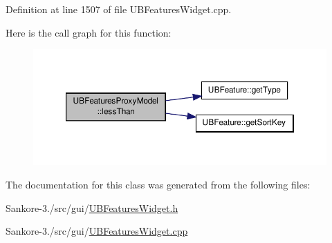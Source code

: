 Definition at line 1507 of file U\-B\-Features\-Widget.\-cpp.



Here is the call graph for this function\-:
\nopagebreak
\begin{figure}[H]
\begin{center}
\leavevmode
\includegraphics[width=350pt]{d9/d6c/class_u_b_features_proxy_model_a7c0c13cd786423d0522355b9ef50b9a0_cgraph}
\end{center}
\end{figure}




The documentation for this class was generated from the following files\-:\begin{DoxyCompactItemize}
\item 
Sankore-\/3./src/gui/\hyperlink{_u_b_features_widget_8h}{U\-B\-Features\-Widget.\-h}\item 
Sankore-\/3./src/gui/\hyperlink{_u_b_features_widget_8cpp}{U\-B\-Features\-Widget.\-cpp}\end{DoxyCompactItemize}
